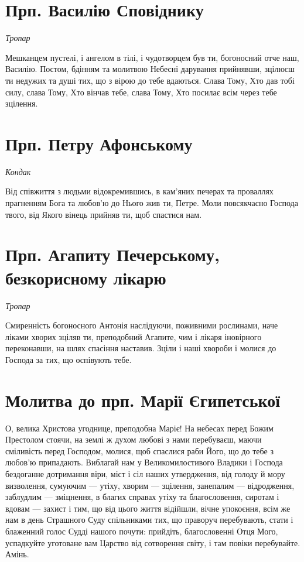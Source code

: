 \documentclass[chapters.tex]{subfiles}
\begin{document}
\section{Прп. Василію Сповіднику}
\emph{Тропар}

Мешканцем пустелі, і ангелом в тілі, і чудотворцем був ти, богоносний отче наш, Василію. Постом, бдінням та молитвою Небесні дарування прийнявши, зцілюєш ти недужих та душі тих, що з вірою до тебе вдаються. Слава Тому, Хто дав тобі силу, слава Тому, Хто вінчав тебе, слава Тому, Хто посилає всім через тебе зцілення.

\section{Прп. Петру Афонському}
\emph{Кондак}

Від співжиття з людьми відокремившись, в кам’яних печерах та проваллях прагненням Бога та любов’ю до Нього жив ти, Петре. Моли повсякчасно Господа твого, від Якого вінець прийняв ти, щоб спастися нам.

\section{Прп. Агапиту Печерському, безкорисному лікарю}
\emph{Тропар}

Смиренність богоносного Антонія наслідуючи, поживними рослинами, наче ліками хворих зціляв ти, преподобний Агапите, чим і лікаря іновірного переконавши, на шлях спасіння наставив. Зціли і наші хвороби і молися до Господа за тих, що оспівують тебе.

\section{Молитва до прп. Марії Єгипетської}
О, велика Христова угоднице, преподобна Маріє! На небесах перед Божим Престолом стоячи, на землі ж духом любові з нами перебуваєш, маючи сміливість перед Господом, молися, щоб спаслися раби Його, що до тебе з любов’ю припадають. Виблагай нам у Великомилостивого Владики і Господа бездоганне дотримання віри, міст і сіл наших утвердження, від голоду й мору визволення, сумуючим — утіху, хворим — зцілення, занепалим — відродження, заблудлим — зміцнення, в благих справах утіху та благословення, сиротам і вдовам — захист і тим, що від цього життя відійшли, вічне упокоєння, всім же нам в день Страшного Суду спільниками тих, що праворуч перебувають, стати і блаженний голос Судді нашого почути: прийдіть, благословенні Отця Мого, успадкуйте уготоване вам Царство від сотворення світу, і там повіки перебувайте. Амінь.
\end{document}
